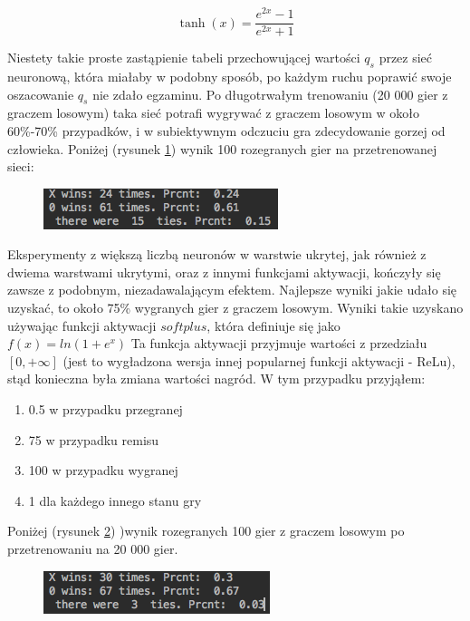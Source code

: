 \documentclass[licencjacka]{pracamgr}
\begin{document}
\begin{equation}
	\tanh(x) = \frac{e^{2x} - 1}{e^{2x} + 1}
\end{equation}

Niestety takie proste zastąpienie tabeli przechowującej wartości $q_{s}$ przez sieć neuronową, która miałaby w podobny sposób, po każdym ruchu poprawić swoje oszacowanie $q_{s}$ nie zdało egzaminu. Po długotrwałym trenowaniu (20 000 gier z graczem losowym) taka sieć potrafi wygrywać z graczem losowym w około 60\%-70\% przypadków, i w subiektywnym odczuciu gra zdecydowanie gorzej od człowieka.  Poniżej (rysunek \ref{Rys25}) wynik 100 rozegranych gier na przetrenowanej sieci:

\begin{figure}[h!]
	\includegraphics [scale=0.7]{nn_I_tanh.png}
	\caption{}
	\label{Rys25}
\end{figure}

Eksperymenty z większą liczbą neuronów w warstwie ukrytej, jak również z dwiema warstwami ukrytymi, oraz z innymi funkcjami aktywacji, kończyły się zawsze z podobnym, niezadawalającym efektem. Najlepsze wyniki jakie udało się uzyskać, to około 75\% wygranych gier z graczem losowym. Wyniki takie uzyskano używając funkcji aktywacji $softplus$, która definiuje się jako  $f(x) = ln(1+e^{x})$ Ta funkcja aktywacji przyjmuje wartości z przedziału $[0,+\infty]$  (jest to wygładzona wersja innej popularnej funkcji aktywacji -  ReLu), stąd konieczna była zmiana wartości nagród. W tym przypadku przyjąłem:

\begin{enumerate}
	\item{0.5 w przypadku przegranej}
	\item{75 w przypadku remisu }
	\item{100 w przypadku wygranej}
	\item{1 dla każdego innego stanu gry}
\end{enumerate}

Poniżej (rysunek \ref{Rys26}) )wynik rozegranych 100 gier z graczem losowym po przetrenowaniu na 20 000 gier.

\begin{figure}[h!]
	\includegraphics [scale=0.7]{nn_I_softplus.png}
	\caption{}
	\label{Rys26}
\end{figure}
\end{document}
